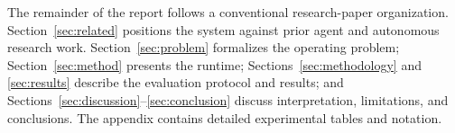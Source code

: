 The remainder of the report follows a conventional research-paper organization.
Section~\ref{sec:related} positions the system against prior agent and
autonomous research work. Section~\ref{sec:problem} formalizes the operating problem;
Section~\ref{sec:method} presents the runtime; Sections~\ref{sec:methodology} and
\ref{sec:results} describe the evaluation protocol and results; and
Sections~\ref{sec:discussion}--\ref{sec:conclusion} discuss interpretation,
limitations, and conclusions. The appendix contains detailed experimental tables
and notation.

